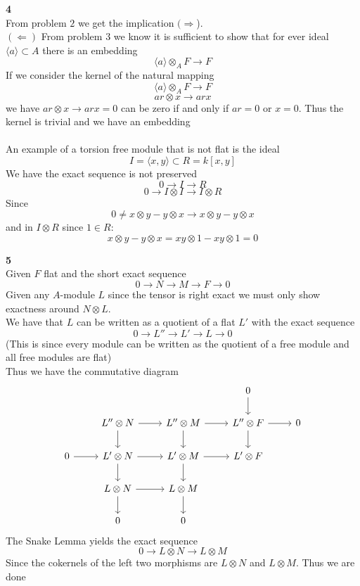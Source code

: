 \documentclass[12pt]{article}
\newenvironment{ques}[1]{\textbf{#1}\vspace{1 mm}\\ }{\bigskip}
\theoremstyle{definition}
\newcommand{\tensor}{\otimes}
\begin{document}
\begin{ques}{4}
	From problem $2$ we get the implication $(\Rightarrow$).\\
	$(\Leftarrow)$ From problem $3$ we know it is sufficient to show that for
	ever ideal $\langle a \rangle \subset A$ there is an embedding 
	$$\langle a \rangle \otimes_A F \to F$$
	If we consider the kernel of the natural mapping 
	$$\langle a \rangle \otimes_A F \to F$$
	$$ar \tensor x \to arx$$
	we have $ar \tensor x \to arx = 0$ can be zero if and only if $ar = 0$ or
	$x = 0$. Thus the kernel is trivial and we have an embedding\\
	\\
	An example of a torsion free module that is not flat is the ideal
	$$I = \langle x, y\rangle \subset R = k[x,y]$$
	We have the exact sequence is not preserved
	$$0 \to I \to R$$
	$$0 \to I \tensor I \to I \tensor R$$
	Since 
	$$0 \neq x \tensor y - y \tensor x \to x \tensor y - y \tensor x$$
	and in $I \tensor R$ since $1 \in R$:
	$$x \tensor y - y \tensor x = xy \tensor 1 - xy \tensor 1 = 0$$
\end{ques}

\begin{ques}{5}
	Given $F$ flat and the short exact sequence 
	$$0 \to N \to M \to F \to 0$$
	Given any $A$-module $L$ since the tensor is right exact we must only
	show exactness around $N \tensor L$.\\
	We have that $L$ can be written as a quotient of a flat $L'$
	with the exact sequence
	$$0 \to L'' \to L' \to L \to 0$$
	(This is since every module can be written as the quotient of a free module
	and all free modules are flat)\\
	Thus we have the commutative diagram
	$$\begin{tikzcd}
	& & & 0 \arrow[d] & \\
	& L'' \tensor N \arrow[r] \arrow[d] & L'' \tensor M \arrow[r]
	\arrow[d] & L'' \tensor F \arrow[r]\arrow[d] & 0\\
	0 \arrow[r] & L' \tensor N \arrow[d]\arrow[r] & L' \tensor M
	\arrow[r]\arrow[d] & L' \tensor F & \\
	& L \tensor N \arrow[d] \arrow[r] & L \tensor M \arrow[d] & \\
	& 0 & 0 &
	\end{tikzcd}$$
	The Snake Lemma yields the exact sequence 
	$$0 \to L \tensor N \to L \tensor M$$
	Since the cokernels of the left two morphisms are $L\tensor
	N$ and $L \tensor M$. Thus we are done
\end{ques}
\end{document}
